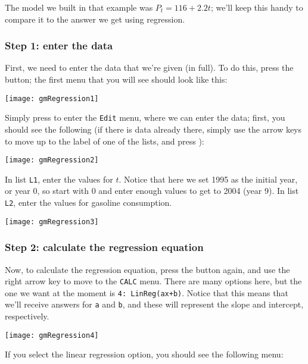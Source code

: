 The model we built in that example was $P_t = 116 + 2.2t$; we'll keep this handy to compare it to the answer we get using regression.

\subsubsection*{Step 1: enter the data}
First, we need to enter the data that we're given (in full).  To do this, press the  button; the first menu that you will see should look like this:
\begin{center}
\texttt{[image: gmRegression1]}
\end{center}

Simply press  to enter the \texttt{Edit} menu, where we can enter the data; first, you should see the following (if there is data already there, simply use the arrow keys to move up to the label of one of the lists, and press ):

\begin{center}
\texttt{[image: gmRegression2]}
\end{center}

In list \texttt{L1}, enter the values for $t$.  Notice that here we set 1995 as the initial year, or year 0, so start with 0 and enter enough values to get to 2004 (year 9).  In list \texttt{L2}, enter the values for gasoline consumption.

\begin{center}
\texttt{[image: gmRegression3]}
\end{center}
\pagebreak

\subsubsection*{Step 2: calculate the regression equation}

Now, to calculate the regression equation, press the  button again, and use the right arrow key to move to the \texttt{CALC} menu.  There are many options here, but the one we want at the moment is \texttt{4: LinReg(ax+b)}.  Notice that this means that we'll receive answers for \texttt{a} and \texttt{b}, and these will represent the slope and intercept, respectively.

\begin{center}
\texttt{[image: gmRegression4]}
\end{center}

If you select the linear regression option, you should see the following menu:

